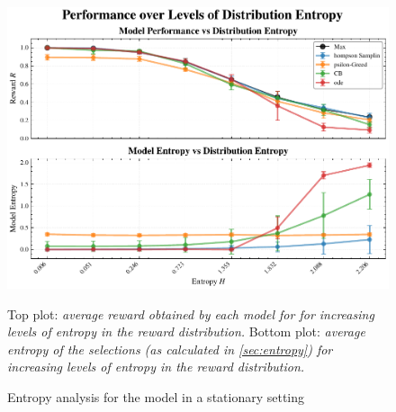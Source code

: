 \begin{figure}[ht]
    \centering
    \includegraphics[width=1.\textwidth]{figures/entropy_performance_plot.pdf}
    \caption{Entropy analysis for the model in a stationary setting} Top plot: \textit{average reward obtained by each model for for increasing levels of entropy in the reward distribution.} Bottom plot: \textit{average entropy of the selections (as calculated in \ref{sec:entropy}) for increasing levels of entropy in the reward distribution.}
\end{figure}\label{fig:entropy_distr}




